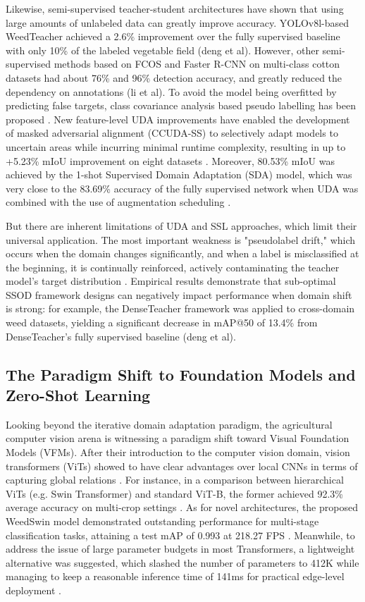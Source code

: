 Likewise, semi-supervised teacher-student architectures have shown that using large amounts of unlabeled data can greatly improve accuracy. YOLOv8l-based WeedTeacher achieved a 2.6\% improvement over the fully supervised baseline with only 10\% of the labeled vegetable field (deng et al). However, other semi-supervised methods based on FCOS and Faster R-CNN on multi-class cotton datasets had about 76\% and 96\% detection accuracy, and greatly reduced the dependency on annotations (li et al). To avoid the model being overfitted by predicting false targets, class covariance analysis based pseudo labelling has been proposed \cite{huang2024}. New feature-level UDA improvements have enabled the development of masked adversarial alignment (CCUDA-SS) to selectively adapt models to uncertain areas while incurring minimal runtime complexity, resulting in up to +5.23\% mIoU improvement on eight datasets \cite{nadeem2026}. Moreover, 80.53\% mIoU was achieved by the 1-shot Supervised Domain Adaptation (SDA) model, which was very close to the 83.69\% accuracy of the fully supervised network when UDA was combined with the use of augmentation scheduling \cite{ilyas2023}.

But there are inherent limitations of UDA and SSL approaches, which limit their universal application. The most important weakness is "pseudolabel drift," which occurs when the domain changes significantly, and when a label is misclassified at the beginning, it is continually reinforced, actively contaminating the teacher model's target distribution \cite{nadeem2026}. Empirical results demonstrate that sub-optimal SSOD framework designs can negatively impact performance when domain shift is strong: for example, the DenseTeacher framework was applied to cross-domain weed datasets, yielding a significant decrease in mAP@50 of 13.4\% from DenseTeacher's fully supervised baseline (deng et al).


\subsection{The Paradigm Shift to Foundation Models and Zero-Shot Learning}
Looking beyond the iterative domain adaptation paradigm, the agricultural computer vision arena is witnessing a paradigm shift toward Visual Foundation Models (VFMs). After their introduction to the computer vision domain, vision transformers (ViTs) showed to have clear advantages over local CNNs in terms of capturing global relations \cite{dosovitskiy2020}. For instance, in a comparison between hierarchical ViTs (e.g. Swin Transformer) and standard ViT-B, the former achieved 92.3\% average accuracy on multi-crop settings \cite{ahmad2024}. As for novel architectures, the proposed WeedSwin model demonstrated outstanding performance for multi-stage classification tasks, attaining a test mAP of 0.993 at 218.27 FPS \cite{islam2025}. Meanwhile, to address the issue of large parameter budgets in most Transformers, a lightweight alternative was suggested, which slashed the number of parameters to 412K while managing to keep a reasonable inference time of 141ms for practical edge-level deployment \cite{yenna2026}.

